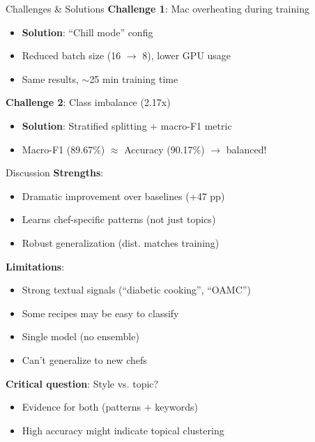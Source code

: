 \documentclass{beamer}
\begin{document}
\begin{frame}{Challenges \& Solutions}
\textbf{Challenge 1}: Mac overheating during training
\begin{itemize}
    \item \textbf{Solution}: ``Chill mode'' config
    \item Reduced batch size (16 $\rightarrow$ 8), lower GPU usage
    \item Same results, $\sim$25 min training time
\end{itemize}

\vspace{0.5cm}

\textbf{Challenge 2}: Class imbalance (2.17x)
\begin{itemize}
    \item \textbf{Solution}: Stratified splitting + macro-F1 metric
    \item Macro-F1 (89.67\%) $\approx$ Accuracy (90.17\%) $\rightarrow$ balanced!
\end{itemize}
\end{frame}

\begin{frame}{Discussion}
\textbf{Strengths}:
\begin{itemize}
    \item Dramatic improvement over baselines (+47 pp)
    \item Learns chef-specific patterns (not just topics)
    \item Robust generalization (dist. matches training)
\end{itemize}

\vspace{0.3cm}

\textbf{Limitations}:
\begin{itemize}
    \item Strong textual signals (``diabetic cooking'', ``OAMC'')
    \item Some recipes may be easy to classify
    \item Single model (no ensemble)
    \item Can't generalize to new chefs
\end{itemize}

\vspace{0.3cm}

\textbf{Critical question}: Style vs. topic?
\begin{itemize}
    \item Evidence for both (patterns + keywords)
    \item High accuracy might indicate topical clustering
\end{itemize}
\end{frame}
\end{document}
